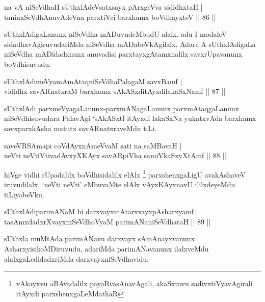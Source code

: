 \begin{shl}
na vA niSeVdhaH sUthxlAdeVsatxsayx pArxgeVva sididhxtaH |\\
taninxSeVdhAnuvAdeVna parxtiVci barxhamx boVdhayxteV \hfill || 86 ||
\end{shl}

\begin{artha}
sUthxlAdigaLanunx niSeVdha mADuvudeMbudU alalx. adu I modaleV sidadhxvAgiruvudariMda niSeVdha mADabeVkAgilalx. Adare A sUthxlAdigaLa niSeVdha mADidadxnunx anuvadisi parxtayxgAtamxnalilx savxrUpavanunx boVdhisuvudu.
\end{artha}

\begin{shl}
sUthxlAdimeVyamAmAtaqniSeVdhaPalagaM savxBamf |\\
vididhx savARnatxraM barxhamx sAkASxditAyxdilakaSxNamf \hfill || 87 ||
\end{shl}

\begin{artha}
sUthxlAdi parxmeVyagaLanunx-parxmANagaLanunx parxmAtaqgaLanunx niSeVdhisuvudara PalavAgi `sAkASxtf itAyxdi lakaSxNa yukatxvAda barxhamx savxparxkAsha matutx savARnatxraveMdu tiLi.
\end{artha}

\begin{shl}
saveVRSAmapi coVdAyxnAmeVvaM sati na saMBavaH |\\
neVti neVtiVtivadAvxyXKAyx savAR\s piVha samiVkaSxyXtAmf \hfill || 88 ||
\end{shl}

\begin{artha}
hiVge vidhi rUpadalilx boVdhisidalilx elAlx \footnote[1]{vAkayxvu aBAvadalilx payaRvasAnavAgali, akaSxravu sadivxtiVyavAgirali itAyxdi parxshenxgaLeMdathaR} parxshenxgaLigU avakAshaveV iruvudilalx, `neVti neVti' eMbuvaMte elAlx vAyxKAyxnavU ililxdeyeMdu tiLiyabeVku.
\end{artha}%

\begin{shl}
sUthxlAdiparimANaM hi darxvayxmAtarxvayxpAsharxyamf |\\
tasAmxdadxrXvayxniSeVdhoV\s yaM parimANaniSeVdhataH \hfill || 89 ||
\end{shl}

\begin{artha}
sUthxla muMtAda parimANavu darxvayx sAmAnayxvanunx AsharxyisikoMDiruvudu, adariMda parimANavanunx ilalxveMdu alalxgaLedidadxriMda darxvayxniSeVdhavidu.
\end{artha}

